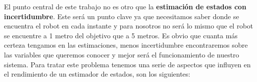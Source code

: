 El punto central de este trabajo no es otro que la \textbf{estimación de estados con incertidumbre}. Este será un punto clave ya que necesitamos saber donde se encuentra el robot en cada instante y para nosotros no será lo mismo que  el robot se encuentre a 1 metro del objetivo que a 5 metros. Es obvio que cuanta más certeza tengamos en las estimaciones, menos incertidumbre encontraremos sobre las variables que queremos conocer y mejor será el funcionamiento de nuestro sistema. Para tratar este problema tenemos una serie de aspectos que influyen en el rendimiento de un estimador de estados, son los siguientes:
%
%
%
%
%
%

